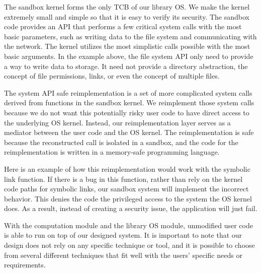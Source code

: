 {The sandbox kernel forms the only TCB of our library OS.
We make the kernel extremely small and simple so that it is easy to verify its security.
The sandbox code provides an API that performs
a few critical system calls with the most basic parameters, such as
writing data to the file system
and communicating with the network.  The kernel utilizes the most simplistic calls
possible with the most
basic arguments. In the example above, the file system API only need to provide a way
to write data to storage.  It need not provide a directory abstraction, the
concept of file permissions, links, or even the concept of multiple files.


The system API safe reimplementation is a set of more complicated system calls
derived from functions in the sandbox kernel.
We reimplement those system calls because we do not want this potentially risky user code
to have direct access to the underlying OS kernel.
Instead, our reimplementation layer serves as a mediator between the user code
and the OS kernel. The reimplementation is safe
because the reconstructed call is isolated in a sandbox, and the code for the
reimplementation is written in a memory-safe programming language.

Here is an example of how this reimplementation would work with the symbolic link function.
If there is a bug in this function, rather than rely on the kernel code paths
for symbolic links, our sandbox system will implement the incorrect behavior.
This denies the code the privileged access to the system the OS kernel does.
As a result, instead of creating a security issue, the application will just fail.

With the computation module and the library OS module, unmodified user code is able to run on top of our designed system.
It is important to note that our design does not rely on any specific technique or tool, and it is possible
to choose from several different techniques that fit well with the users' specific needs or requirements.

}
